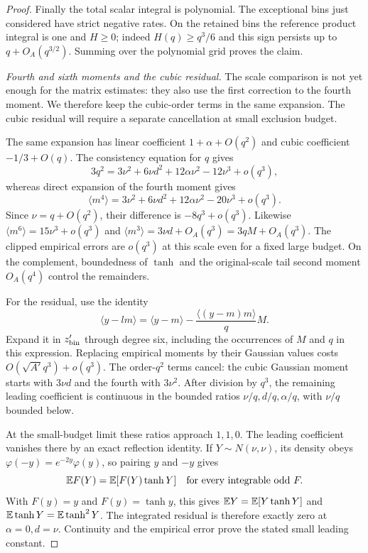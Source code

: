 \begin{proof}
Finally the total scalar integral is polynomial. The exceptional bins
just considered have strict negative rates. On the retained bins the
reference product integral is one and $H\ge0$; indeed
$H(q)\ge q^3/6$ and this sign persists up to
$q+O_A(q^{3/2})$. Summing over the polynomial grid proves the claim.

\par\smallskip\noindent\textit{Fourth and sixth moments and the cubic residual.}\enspace
The scale comparison is not yet enough for the matrix estimates: they
also use the first correction to the fourth moment. We therefore keep
the cubic-order terms in the same expansion. The cubic residual will
require a separate cancellation at small exclusion budget.

The same expansion has linear coefficient $1+\alpha+O(q^2)$ and
cubic coefficient $-1/3+O(q)$. The consistency equation for $q$ gives
\[
 3q^2=3\nu^2+6\nu d^2+12\alpha\nu^2-12\nu^3+o(q^3),
\]
whereas direct expansion of the fourth moment gives
\[
 \langle m^4\rangle
 =3\nu^2+6\nu d^2+12\alpha\nu^2-20\nu^3+o(q^3).
\]
Since $\nu=q+O(q^2)$, their difference is $-8q^3+o(q^3)$.
Likewise $\langle m^6\rangle=15\nu^3+o(q^3)$ and
$\langle m^3\rangle=3\nu d+O_A(q^3)=3qM+O_A(q^3)$.
The clipped empirical errors are $o(q^3)$ at this scale even for a
fixed large budget. On the complement, boundedness of $\tanh$ and the
original-scale tail second moment $O_A(q^4)$ control the remainders.

For the residual, use the identity
\[
 \langle y-lm\rangle
 =\langle y-m\rangle-
       \frac{\langle(y-m)m\rangle}{q}M.
\]
Expand it in $z'_{\rm bin}$ through degree six, including the occurrences of
$M$ and $q$ in this expression. Replacing empirical moments by their
Gaussian values costs $O(\sqrt{A'}q^3)+o(q^3)$. The order-$q^2$
terms cancel: the cubic Gaussian moment starts with $3\nu d$ and the
fourth with $3\nu^2$. After division by $q^3$, the remaining leading
coefficient is continuous in the bounded ratios
$\nu/q,d/q,\alpha/q$, with $\nu/q$ bounded below.

At the small-budget limit these ratios approach $1,1,0$. The leading
coefficient vanishes there by an exact reflection identity. If
$Y\sim N(\nu,\nu)$, its density obeys
$\varphi(-y)=e^{-2y}\varphi(y)$, so pairing $y$ and $-y$ gives
\[
 \mathbb E F(Y)=\mathbb E[F(Y)\tanh Y]
 \quad\text{for every integrable odd }F.
\]
With $F(y)=y$ and $F(y)=\tanh y$, this gives
$\mathbb E Y=\mathbb E[Y\tanh Y]$ and $\mathbb E\tanh Y=\mathbb E\tanh^2Y$.
The integrated residual is therefore exactly zero at
$\alpha=0,d=\nu$. Continuity and the empirical error prove the stated
small leading constant.


\end{proof}
